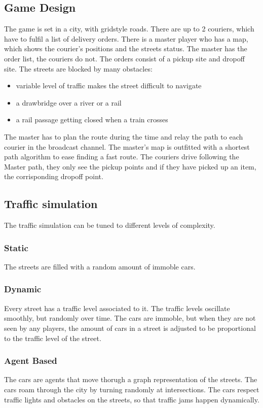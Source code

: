 \documentclass{article}
\begin{document}
\subsection{Game Design}
The game is set in a city, with gridstyle roads.
There are up to 2 couriers, which have to fulfil a list of delivery orders.
There is a master player who has a map, which shows the courier's positions and the streets status. The master has the order list, the couriers do not.
The orders consist of a pickup site and dropoff site.
The streets are blocked by many obstacles:
\begin{itemize}
  \item variable level of traffic makes the street difficult to navigate
  \item a drawbridge over a river or a rail
  \item a rail passage getting closed when a train crosses
\end{itemize}
The master has to plan the route during the time and relay the path to each courier in the broadcast channel.
The master's map is outfitted with a shortest path algorithm to ease finding a fast route.
The couriers drive following the Master path, they only see the pickup points and if they have picked up an item, the corrisponding dropoff point.
\subsection{Traffic simulation}
The traffic simulation can be tuned to different levels of complexity.
\subsubsection{Static}
The streets are filled with a random amount of immoble cars.
\subsubsection{Dynamic}
Every street has a traffic level associated to it. The traffic levels oscillate smoothly, but randomly over time. The cars are immoble, but when they are not seen by any players, the amount of cars in a street is adjusted to be proportional to the traffic level of the street.
\subsubsection{Agent Based}
The cars are agents that move thorugh a graph representation of the streets. The cars roam through the city by turning randomly at intersections. The cars respect traffic lights and obstacles on the streets, so that traffic jams happen dynamically.
\end{document}
